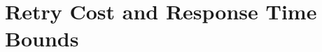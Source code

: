 \documentclass[conference]{IEEEtran}
\begin{document}
\begin{comment}
%
\item \label{fblt_ex_step 7} $s_{j}^{l}(\theta_{3})$ commits but $s_{g}^{h}(\theta_{3})$
is released. $p_{g}^{h}>p_{e}^{f}$ but $\eta_{e}^{f}=\delta_{e}^{f}$.
So, $s_{e}^{f}(\theta_{2},\theta_{3})$ becomes a non-preemptive transaction.
$m\_set=\left\{ s_{i}^{k}(\theta_{1},\theta_{2}),s_{g}^{h}(\theta_{2},\theta_{3})\right\} $.
%
\item $s_{i}^{k}(\theta_{1},\theta_{2})$ and $s_{g}^{h}(\theta_{2},\theta_{3})$
are now non-preemptive transactions. $s_{i}^{k}(\theta_{1},\theta_{2})$
and $s_{g}^{h}(\theta_{2},\theta_{3})$ still conflict together. So,
they are executed according to their addition order to the $m\_$set.
So, $s_{i}^{k}(\theta_{1},\theta_{2})$ commits first, followed $s_{g}^{h}(\theta_{2},\theta_{3})$.
\item $s_{g}^{h}(\theta_{3})$ will continue to abort and retry in favor
of $s_{e}^{f}(\theta_{2},\theta_{3})$ until $s_{e}^{f}(\theta_{2},\theta_{3})$
commits or $\eta_{g}^{h}=\delta_{g}^{h}$. Even if $s_{g}^{h}(\theta_{3})$
joined the $m\_$set, $s_{g}^{h}(\theta_{3})$ will still abort and retry
in favor of $s_{e}^{f}(\theta_{2},\theta_{3})$, because $s_{e}^{f}(\theta_{2},\theta_{3})$ joined the $m\_$set earlier than $s_{g}^{h}(\theta_{3})$.
\end{compactenum}

It is seen from steps \ref{fblt_ex_step 2} to \ref{fblt_ex_step 6}
that $s_{i}^{k}(\theta_{1},\theta_{2})$ can be aborted due to direct
conflict with other transactions, or due to transitive retry. Irrespective of 
the reason for the conflict, once a transaction has reached its maximum
allowed $\delta$, the transaction becomes a non-preemptive one
(steps \ref{fblt_ex_step 6} and \ref{fblt_ex_step 7}). Non-preemptive
transactions have higher priority than other preemptive transactions
(steps \ref{fblt_ex_step 6} and \ref{fblt_ex_step 7}). Non-preemptive
transactions execute in their arrival order to the $m\_$set.
\end{comment}

\section{Retry Cost and Response Time Bounds}\label{fblt rc}
\end{document}
